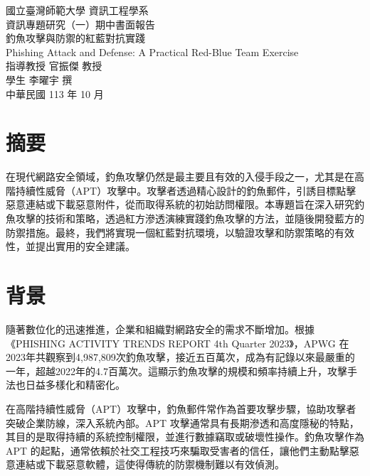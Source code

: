\documentclass[a4paper,12pt]{article}
\begin{document}
\begin{titlepage}
  \begin{center}
    \vspace*{2cm}
    {\fontsize{16pt}{16pt}\selectfont 國立臺灣師範大學 資訊工程學系}\\[1cm]
    {\fontsize{16pt}{16pt} 資訊專題研究（一）期中書面報告}\\[4cm]
    {\fontsize{16pt}{16pt}\selectfont 釣魚攻擊與防禦的紅藍對抗實踐}\\[1cm]
    {\fontsize{16pt}{16pt}\selectfont Phishing Attack and Defense: A Practical Red-Blue Team Exercise}\\[9cm]
    {\fontsize{12pt}{12pt}\selectfont 指導教授 官振傑 教授}\\[0.5cm]
    {\fontsize{12pt}{12pt}\selectfont 學生 李曜宇 撰}\\[0.5cm]
    {\fontsize{12pt}{12pt}\selectfont 中華民國 113 年 10 月}
  \end{center}
\end{titlepage}

\newpage

\section*{摘要}
在現代網路安全領域，釣魚攻擊仍然是最主要且有效的入侵手段之一，尤其是在高階持續性威脅（APT）攻擊中。攻擊者透過精心設計的釣魚郵件，引誘目標點擊惡意連結或下載惡意附件，從而取得系統的初始訪問權限。本專題旨在深入研究釣魚攻擊的技術和策略，透過紅方滲透演練實踐釣魚攻擊的方法，並隨後開發藍方的防禦措施。最終，我們將實現一個紅藍對抗環境，以驗證攻擊和防禦策略的有效性，並提出實用的安全建議。

\section{背景}
隨著數位化的迅速推進，企業和組織對網路安全的需求不斷增加。根據《PHISHING ACTIVITY TRENDS REPORT 4th Quarter 2023》，APWG 在2023年共觀察到4,987,809次釣魚攻擊，接近五百萬次，成為有記錄以來最嚴重的一年，超越2022年的4.7百萬次。這顯示釣魚攻擊的規模和頻率持續上升，攻擊手法也日益多樣化和精密化。\cite{apwg2023}

在高階持續性威脅（APT）攻擊中，釣魚郵件常作為首要攻擊步驟，協助攻擊者突破企業防線，深入系統內部。APT 攻擊通常具有長期滲透和高度隱秘的特點，其目的是取得持續的系統控制權限，並進行數據竊取或破壞性操作。釣魚攻擊作為 APT 的起點，通常依賴於社交工程技巧來騙取受害者的信任，讓他們主動點擊惡意連結或下載惡意軟體，這使得傳統的防禦機制難以有效偵測。
\end{document}
